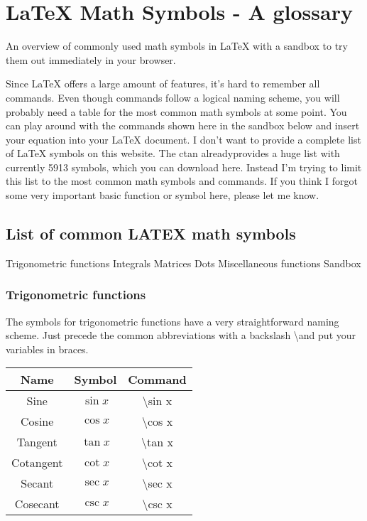 \maketitle
\newpage

\section{LaTeX Math Symbols - A glossary}
An overview of commonly used math symbols in LaTeX with a sandbox to try them out immediately in your browser.

Since LaTeX offers a large amount of features, it's hard to remember all commands. Even though commands follow a logical naming scheme, you will probably need a table for the most common math symbols at some point. You can play around with the commands shown here in the sandbox below and insert your equation into your LaTeX document. I don't want to provide a complete list of LaTeX symbols on this website. The ctan alreadyprovides a huge list with currently 5913 symbols, which you can download here. Instead I'm trying to limit this list to the most common math symbols and commands. If you think I forgot some very important basic function or symbol here, please let me know.

\subsection{List of common LATEX math symbols}
Trigonometric functions
Integrals
Matrices
Dots
Miscellaneous functions
Sandbox




\subsubsection{Trigonometric functions}
The symbols for trigonometric functions have a very straightforward naming scheme. Just precede the common abbreviations with a backslash \textbackslash and put your variables in braces.

\begin{center}
\begin{tabular}{ccc}
\toprule  %
Name &	Symbol &	Command\\
\midrule  %
Sine &  $\sin x$ & \textbackslash sin x \\
Cosine &  $\cos x$ & \textbackslash cos x \\
Tangent &  $\tan x$ & \textbackslash tan x \\
Cotangent &  $\cot x$ & \textbackslash cot x\\
Secant &  $\sec x$ & \textbackslash sec x \\
Cosecant &  $\csc x$ & \textbackslash csc x\\
\bottomrule %
\end{tabular}
\end{center}




